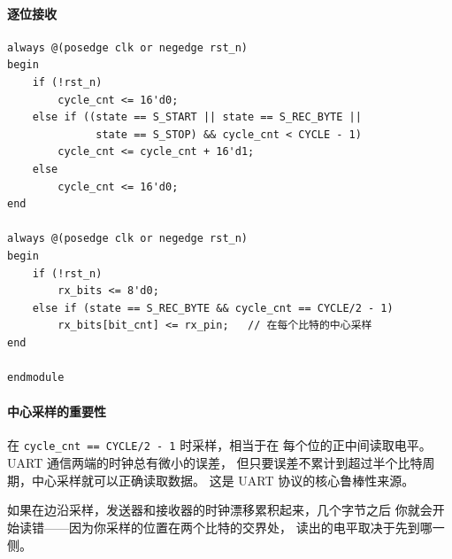 \paragraph{逐位接收}

\begin{lstlisting}[style=verilog]
always @(posedge clk or negedge rst_n)
begin
    if (!rst_n)
        cycle_cnt <= 16'd0;
    else if ((state == S_START || state == S_REC_BYTE ||
              state == S_STOP) && cycle_cnt < CYCLE - 1)
        cycle_cnt <= cycle_cnt + 16'd1;
    else
        cycle_cnt <= 16'd0;
end

always @(posedge clk or negedge rst_n)
begin
    if (!rst_n)
        rx_bits <= 8'd0;
    else if (state == S_REC_BYTE && cycle_cnt == CYCLE/2 - 1)
        rx_bits[bit_cnt] <= rx_pin;   // 在每个比特的中心采样
end

endmodule
\end{lstlisting}

\paragraph{中心采样的重要性}
在 \texttt{cycle\_cnt == CYCLE/2 - 1} 时采样，相当于在
每个位的正中间读取电平。UART 通信两端的时钟总有微小的误差，
但只要误差不累计到超过半个比特周期，中心采样就可以正确读取数据。
这是 UART 协议的核心鲁棒性来源。

如果在边沿采样，发送器和接收器的时钟漂移累积起来，几个字节之后
你就会开始读错——因为你采样的位置在两个比特的交界处，
读出的电平取决于先到哪一侧。
